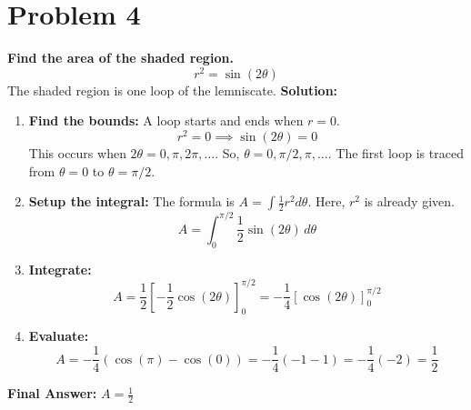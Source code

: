 \documentclass{article}
\begin{document}
\section*{Problem 4}
\textbf{Find the area of the shaded region.}
\[ r^2 = \sin(2\theta) \]
The shaded region is one loop of the lemniscate.
\textbf{Solution:}
\begin{enumerate}
    \item \textbf{Find the bounds:} A loop starts and ends when $r=0$.
    \[ r^2 = 0 \implies \sin(2\theta) = 0 \]
    This occurs when $2\theta = 0, \pi, 2\pi, \dots$. So, $\theta = 0, \pi/2, \pi, \dots$. The first loop is traced from $\theta=0$ to $\theta=\pi/2$.
    \item \textbf{Setup the integral:} The formula is $A = \int \frac{1}{2}r^2 d\theta$. Here, $r^2$ is already given.
    \[ A = \int_{0}^{\pi/2} \frac{1}{2} \sin(2\theta) \,d\theta \]
    \item \textbf{Integrate:}
    \[ A = \frac{1}{2} \left[ -\frac{1}{2}\cos(2\theta) \right]_{0}^{\pi/2} = -\frac{1}{4} \left[ \cos(2\theta) \right]_{0}^{\pi/2} \]
    \item \textbf{Evaluate:}
    \[ A = -\frac{1}{4} (\cos(\pi) - \cos(0)) = -\frac{1}{4} (-1 - 1) = -\frac{1}{4}(-2) = \frac{1}{2} \]
\end{enumerate}
\textbf{Final Answer:} $A = \frac{1}{2}$
\newpage
\end{document}
